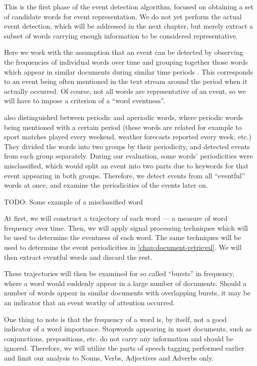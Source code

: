 This is the first phase of the event detection algorithm, focused on obtaining a set of candidate words for event representation. We do not yet perform the actual event detection, which will be addressed in the next chapter, but merely extract a subset of words carrying enough information to be considered representative.

Here we work with the assumption that an event can be detected by observing the frequencies of individual words over time and grouping together those words which appear in similar documents during similar time periods \cite{event-detection, parameter-free}. This corresponds to an event being often mentioned in the text stream around the period when it actually occurred. Of course, not all words are representative of an event, so we will have to impose a criterion of a ``word eventness''.

\cite{event-detection} also distinguished between periodic and aperiodic words, where periodic words being mentioned with a certain period (these words are related for example to sport matches played every weekend, weather forecasts reported every week, etc.) They divided the words into two groups by their periodicity, and detected events from each group separately. During our evaluation, some words' periodicities were misclassified, which would split an event into two parts due to keywords for that event appearing in both groups. Therefore, we detect events from all ``eventful'' words at once, and examine the periodicities of the events later on.

{\color{red} TODO: Some example of a misclassified word}

At first, we will construct a trajectory of each word --- a measure of word frequency over time. Then, we will apply signal processing techniques which will be used to determine the eventness of each word. The same techniques will be used to determine the event periodicities in \autoref{chap:document-retrieval}. We will then extract eventful words and discard the rest.

These trajectories will then be examined for so called ``bursts'' in frequency, where a word would suddenly appear in a large number of documents. Should a number of words appear in similar documents with overlapping bursts, it may be an indicator that an event worthy of attention occurred.

One thing to note is that the frequency of a word is, by itself, not a good indicator of a word importance.
Stopwords appearing in most documents, such as conjunctions, prepositions, etc. do not carry any information and should be ignored. Therefore, we will utilize the parts of speech tagging performed earlier and limit our analysis to Nouns, Verbs, Adjectives and Adverbs only.


